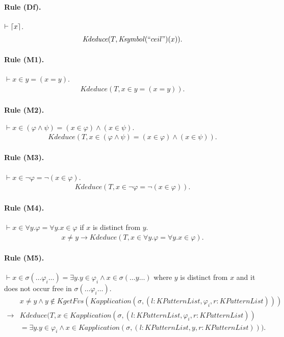 \documentclass[UTF8]{article}
\theoremstyle{plain}
\theoremstyle{definition}
\theoremstyle{remark}
\newcommand{\cln}{{:}}
\DeclarePairedDelimiter{\ceil}{\lceil}{\rceil}
\newcommand{\Ksymbol}{\mathit{Ksymbol}}
\newcommand{\KPatternList}{\mathit{KPatternList}}
\newcommand{\Kapplication}{\mathit{Kapplication}}
\newcommand{\kand}{\wedge}
\newcommand{\knot}{\neg}
\newcommand{\kexists}{\exists}
\newcommand{\kforall}{\forall}
\newcommand{\kequals}{=}
\newcommand{\kin}{\in}
\newcommand{\KgetFvs}{\mathit{KgetFvs}}
\newcommand{\Kdeduce}{\mathit{Kdeduce}}
\begin{document}
\paragraph{Rule (Df).}
$\vdash \ceil{x}$.
\begin{align*}
\Kdeduce(T, \Ksymbol(``ceil")(x)).
\end{align*}

\paragraph{Rule (M1).}
$\vdash x \in y = (x = y)$.
\begin{align*}
\Kdeduce(T, x \kin y \kequals (x \kequals y)).
\end{align*}

\paragraph{Rule (M2).}
$\vdash x \in (\varphi \wedge \psi) = (x \in \varphi) \wedge (x \in \psi).$
\begin{align*}
\Kdeduce(T, x \kin (\varphi \kand \psi) \kequals (x \kin \varphi) \kand (x \kin \psi)).
\end{align*}

\paragraph{Rule (M3).}
$\vdash x \in \neg \varphi = \neg (x \in \varphi)$.
\begin{align*}
\Kdeduce(T, x \kin \knot \varphi \kequals \knot (x \kin \varphi)).
\end{align*}

\paragraph{Rule (M4).}
$\vdash x \in \forall y . \varphi = \forall y . x \in \varphi$ if $x$ is distinct from $y$.
\begin{align*}
x \neq y \to \Kdeduce(T, x \kin \kforall y . \varphi \kequals \kforall y . x \kin \varphi).
\end{align*}

\paragraph{Rule (M5).}
$\vdash x \in \sigma(\dots \varphi_i \dots) = \exists y . y \in \varphi_i \wedge x \in \sigma(\dots y \dots)$ where $y$ is distinct from $x$ and it does not occur free in $\sigma(\dots \varphi_i \dots)$.
\begin{align*}
&x \neq y \wedge y \not\in \KgetFvs(\Kapplication(\sigma, (l\cln\KPatternList, \varphi_i, r\cln\KPatternList)))
\\
\to&\Kdeduce(T, x \kin \Kapplication(\sigma, (l\cln\KPatternList, \varphi_i, r\cln\KPatternList))
\\
&\kequals \kexists y . y \kin \varphi_i \kand x \kin \Kapplication(\sigma, (l\cln\KPatternList, y, r\cln\KPatternList))).
\end{align*}
\end{document}

